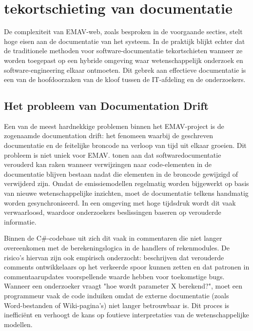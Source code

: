 \chapter{tekortschieting van documentatie}
\label{ch:tekortschieting_documentatie}

De complexiteit van EMAV-web, zoals besproken in de voorgaande secties, stelt hoge eisen aan de documentatie van het systeem. In de praktijk blijkt echter dat de traditionele methoden voor software-documentatie tekortschieten wanneer ze worden toegepast op een hybride omgeving waar wetenschappelijk onderzoek en software-engineering elkaar ontmoeten. Dit gebrek aan effectieve documentatie is een van de hoofdoorzaken van de kloof tussen de IT-afdeling en de onderzoekers.

\section{Het probleem van \textquotedbl Documentation Drift\textquotedbl}
Een van de meest hardnekkige problemen binnen het EMAV-project is de zogenaamde documentation drift: het fenomeen waarbij de geschreven documentatie en de feitelijke broncode na verloop van tijd uit elkaar groeien. Dit probleem is niet uniek voor EMAV. \textcite{tan2024outdatedDocumentation} tonen aan dat softwaredocumentatie verouderd kan raken wanneer verwijzingen naar code-elementen in de documentatie blijven bestaan nadat die elementen in de broncode gewijzigd of verwijderd zijn. Omdat de emissiemodellen regelmatig worden bijgewerkt op basis van nieuwe wetenschappelijke inzichten, moet de documentatie telkens handmatig worden gesynchroniseerd. In een omgeving met hoge tijdsdruk wordt dit vaak verwaarloosd, waardoor onderzoekers beslissingen baseren op verouderde informatie.

Binnen de C\#-codebase uit zich dit vaak in commentaren die niet langer overeenkomen met de berekeningslogica in de handlers of rekenmodules. De risico's hiervan zijn ook empirisch onderzocht: \textcite{ibrahim2012commentBugs} beschrijven dat verouderde comments ontwikkelaars op het verkeerde spoor kunnen zetten en dat patronen in commentaarupdates voorspellende waarde hebben voor toekomstige bugs. Wanneer een onderzoeker vraagt "hoe wordt parameter X berekend?", moet een programmeur vaak de code induiken omdat de externe documentatie (zoals Word-bestanden of Wiki-pagina's) niet langer betrouwbaar is. Dit proces is inefficiënt en verhoogt de kans op foutieve interpretaties van de wetenschappelijke modellen.

